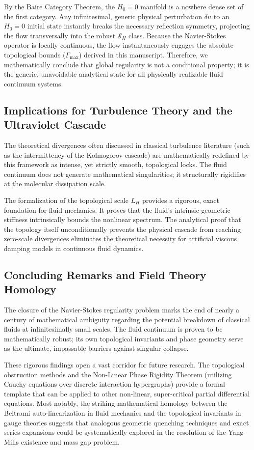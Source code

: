 \documentclass[12pt,a4paper]{article}
\theoremstyle{plain}
\theoremstyle{definition}
\theoremstyle{remark}
\begin{document}
By the Baire Category Theorem, the $H_0=0$ manifold is a nowhere dense set of the first category. Any infinitesimal, generic physical perturbation $\delta u$ to an $H_0=0$ initial state instantly breaks the necessary reflection symmetry, projecting the flow transversally into the robust $\mathcal{S}_H$ class. Because the Navier-Stokes operator is locally continuous, the flow instantaneously engages the absolute topological bounds ($\Gamma_{\max}$) derived in this manuscript. Therefore, we mathematically conclude that global regularity is not a conditional property; it is the generic, unavoidable analytical state for all physically realizable fluid continuum systems.

\subsection{Implications for Turbulence Theory and the Ultraviolet Cascade}
The theoretical divergences often discussed in classical turbulence literature (such as the intermittency of the Kolmogorov cascade) are mathematically redefined by this framework as intense, yet strictly smooth, topological locks. The fluid continuum does not generate mathematical singularities; it structurally rigidifies at the molecular dissipation scale. 

The formalization of the topological scale $L_H$ provides a rigorous, exact foundation for fluid mechanics. It proves that the fluid's intrinsic geometric stiffness intrinsically bounds the nonlinear spectrum. The analytical proof that the topology itself unconditionally prevents the physical cascade from reaching zero-scale divergences eliminates the theoretical necessity for artificial viscous damping models in continuous fluid dynamics.

\subsection{Concluding Remarks and Field Theory Homology}
The closure of the Navier-Stokes regularity problem marks the end of nearly a century of mathematical ambiguity regarding the potential breakdown of classical fluids at infinitesimally small scales. The fluid continuum is proven to be mathematically robust; its own topological invariants and phase geometry serve as the ultimate, impassable barriers against singular collapse. 



These rigorous findings open a vast corridor for future research. The topological obstruction methods and the Non-Linear Phase Rigidity Theorem (utilizing Cauchy equations over discrete interaction hypergraphs) provide a formal template that can be applied to other non-linear, super-critical partial differential equations. Most notably, the striking mathematical homology between the Beltrami auto-linearization in fluid mechanics and the topological invariants in gauge theories suggests that analogous geometric quenching techniques and exact series expansions could be systematically explored in the resolution of the Yang-Mills existence and mass gap problem.
\end{document}
